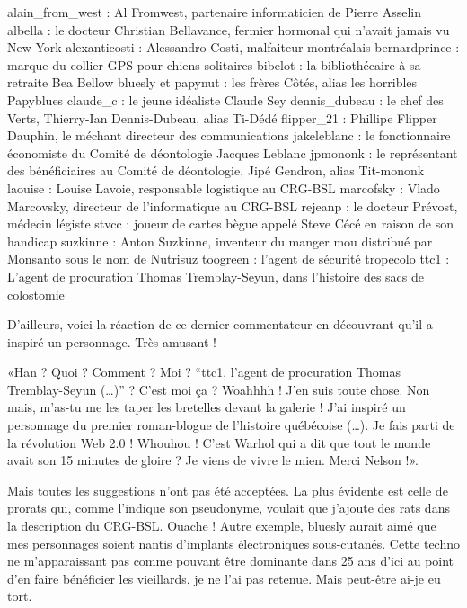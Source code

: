 \begin{Postface}
    alain_from_west : Al Fromwest, partenaire informaticien de Pierre Asselin
    albella : le docteur Christian Bellavance, fermier hormonal qui n’avait jamais vu New York
    alexanticosti : Alessandro Costi, malfaiteur montréalais
    bernardprince : marque du collier GPS pour chiens solitaires
    bibelot : la bibliothécaire à sa retraite Bea Bellow
    bluesly et papynut : les frères Côtés, alias les horribles Papyblues
    claude_c : le jeune idéaliste Claude Sey
    dennis_dubeau : le chef des Verts, Thierry-Ian Dennis-Dubeau, alias Ti-Dédé
    flipper_21 : Phillipe Flipper Dauphin, le méchant directeur des communications
    jakeleblanc : le fonctionnaire économiste du Comité de déontologie Jacques Leblanc
    jpmononk : le représentant des bénéficiaires au Comité de déontologie, Jipé Gendron, alias Tit-mononk
    laouise : Louise Lavoie, responsable logistique au CRG-BSL
    marcofsky : Vlado Marcovsky, directeur de l’informatique au CRG-BSL
    rejeanp : le docteur Prévost, médecin légiste
    stvcc : joueur de cartes bègue appelé Steve Cécé en raison de son handicap
    suzkinne : Anton Suzkinne, inventeur du manger mou distribué par Monsanto sous le nom de Nutrisuz
    toogreen : l’agent de sécurité tropecolo
    ttc1 : L’agent de procuration Thomas Tremblay-Seyun, dans l’histoire des sacs de colostomie

D’ailleurs, voici la réaction de ce dernier commentateur en découvrant qu’il a inspiré un personnage. Très amusant !

    «Han ? Quoi ? Comment ? Moi ? “ttc1, l’agent de procuration Thomas Tremblay-Seyun (…)” ? C’est moi ça ? Woahhhh ! J’en suis toute chose. Non mais, m’as-tu me les taper les bretelles devant la galerie ! J’ai inspiré un personnage du premier roman-blogue de l’histoire québécoise (…). Je fais parti de la révolution Web 2.0 ! Whouhou ! C’est Warhol qui a dit que tout le monde avait son 15 minutes de gloire ? Je viens de vivre le mien. Merci Nelson !».

Mais toutes les suggestions n’ont pas été acceptées. La plus évidente est celle de prorats qui, comme l’indique son pseudonyme, voulait que j’ajoute des rats dans la description du CRG-BSL. Ouache ! Autre exemple, bluesly aurait aimé que mes personnages soient nantis d’implants électroniques sous-cutanés. Cette techno ne m’apparaissant pas comme pouvant être dominante dans 25 ans d’ici au point d’en faire bénéficier les vieillards, je ne l’ai pas retenue. Mais peut-être ai-je eu tort.


\end{Postface}
